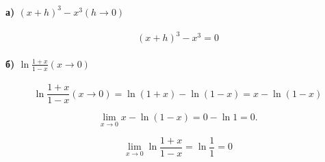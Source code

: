 \documentclass[../rgr1.tex]{subfiles}
\begin{document}

\paragraph{а) $(x+h)^3 - x^3 (h\to 0)$}

\Solution
\begin{equation}
	(x+h)^3 - x^3 =
	0
\end{equation}

\paragraph{б) $\ln\frac{1+x}{1-x} (x\to 0)$}

\Solution

\begin{equation}
	\ln\frac{1+x}{1-x} (x\to 0) = \ln{(1+x)} - \ln{(1-x)} = x - \ln{(1-x)}
\end{equation}

\begin{equation}
	\lim_{x\to0}{x - \ln{(1-x)}} = 0 - \ln1 = 0.
\end{equation}

\begin{equation}
	\lim_{x\to0}\ln\frac{1+x}{1-x} =
	\ln\frac{1}{1} = 0
\end{equation}

\Answer{<++>}
\end{document}
